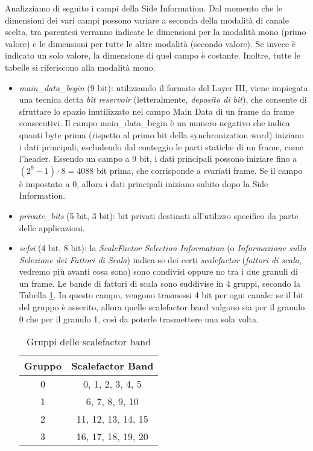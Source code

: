 			Analizziamo di seguito i campi della Side Information. Dal momento che le dimensioni dei vari campi possono variare a seconda della modalità di canale scelta, tra parentesi verranno indicate le dimensioni per la modalità mono (primo valore) e le dimensioni per tutte le altre modalità (secondo valore). Se invece è indicato un solo valore, la dimensione di quel campo è costante. Inoltre, tutte le tabelle si riferiscono alla modalità mono.
			
			\begin{itemize}
				\item \textit{main\_data\_begin} (9 bit): utilizzando il formato del Layer III, viene impiegata una tecnica detta \textit{bit reservoir} (letteralmente, \textit{deposito di bit}), che consente di sfruttare lo spazio inutilizzato nel campo Main Data di un frame da frame consecutivi. Il campo main\_data\_begin è un numero negativo che indica quanti byte prima (rispetto al primo bit della synchronization word) iniziano i dati principali, escludendo dal conteggio le parti statiche di un frame, come l'header. Essendo un campo a 9 bit, i dati principali possono iniziare fino a $(2^9-1) \cdot 8 = 4088$ bit prima, che corrisponde a svariati frame. Se il campo è impostato a 0, allora i dati principali iniziano subito dopo la Side Information.
				
				\item \textit{private\_bits} (5 bit, 3 bit): bit privati destinati all'utilizzo specifico da parte delle applicazioni.
				
				\item \textit{scfsi} (4 bit, 8 bit): la \textit{ScaleFactor Selection Information} (o \textit{Informazione sulla Selezione dei Fattori di Scala}) indica se dei certi \textit{scalefactor} (\textit{fattori di scala}, vedremo più avanti cosa sono) sono condivisi oppure no tra i due granuli di un frame. Le bande di fattori di scala sono suddivise in 4 gruppi, secondo la Tabella \ref{tab:gruppi_scalefactor}. In questo campo, vengono trasmessi 4 bit per ogni canale: se il bit del gruppo è asserito, allora quelle scalefactor band valgono sia per il granulo 0 che per il granulo 1, così da poterle trasmettere una sola volta.
				
					\begin{table}[h!]
						\centering
						\begin{tabular}{|c|c|}
							\multicolumn{1}{c}{\textbf{Gruppo}} & \multicolumn{1}{c}{\textbf{Scalefactor Band}}\\
							\hline
							0 & 0, 1, 2, 3, 4, 5\\
							\hline
							1 & 6, 7, 8, 9, 10\\
							\hline
							2 & 11, 12, 13, 14, 15\\
							\hline
							3 & 16, 17, 18, 19, 20\\
							\hline
						\end{tabular}
						\caption{Gruppi delle scalefactor band}
						\label{tab:gruppi_scalefactor}
					\end{table}
				

\end{itemize}
